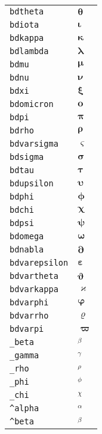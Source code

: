 \begin{longtable}{ll}
\texttt{bdtheta}&${}\boldsymbol{\theta} {}$\\
\texttt{bdiota}&${}\boldsymbol{\iota} {}$\\
\texttt{bdkappa}&${}\boldsymbol{\kappa} {}$\\
\texttt{bdlambda}&${}\boldsymbol{\lambda} {}$\\
\texttt{bdmu}&${}\boldsymbol{\mu} {}$\\
\texttt{bdnu}&${}\boldsymbol{\nu} {}$\\
\texttt{bdxi}&${}\boldsymbol{\xi} {}$\\
\texttt{bdomicron}&${}\boldsymbol{o} {}$\\
\texttt{bdpi}&${}\boldsymbol{\pi} {}$\\
\texttt{bdrho}&${}\boldsymbol{\rho} {}$\\
\texttt{bdvarsigma}&${}\boldsymbol{\varsigma} {}$\\
\texttt{bdsigma}&${}\boldsymbol{\sigma} {}$\\
\texttt{bdtau}&${}\boldsymbol{\tau} {}$\\
\texttt{bdupsilon}&${}\boldsymbol{\upsilon} {}$\\
\texttt{bdphi}&${}\boldsymbol{\phi} {}$\\
\texttt{bdchi}&${}\boldsymbol{\chi} {}$\\
\texttt{bdpsi}&${}\boldsymbol{\psi} {}$\\
\texttt{bdomega}&${}\boldsymbol{\omega} {}$\\
\texttt{bdnabla}&${}\boldsymbol{\partial} {}$\\
\texttt{bdvarepsilon}&${}\boldsymbol{\varepsilon} {}$\\
\texttt{bdvartheta}&${}\boldsymbol{\vartheta} {}$\\
\texttt{bdvarkappa}&${}\boldsymbol{\varkappa} {}$\\
\texttt{bdvarphi}&${}\boldsymbol{\varphi} {}$\\
\texttt{bdvarrho}&${}\boldsymbol{\varrho} {}$\\
\texttt{bdvarpi}&${}\boldsymbol{\varpi} {}$\\
\texttt{\_beta}&${}_\beta {}$\\
\texttt{\_gamma}&${}_\gamma {}$\\
\texttt{\_rho}&${}_\rho {}$\\
\texttt{\_phi}&${}_\phi {}$\\
\texttt{\_chi}&${}_\chi {}$\\
\texttt{\textasciicircum alpha}&${}^\alpha {}$\\
\texttt{\textasciicircum beta}&${}^\beta {}$\\

\end{longtable}
